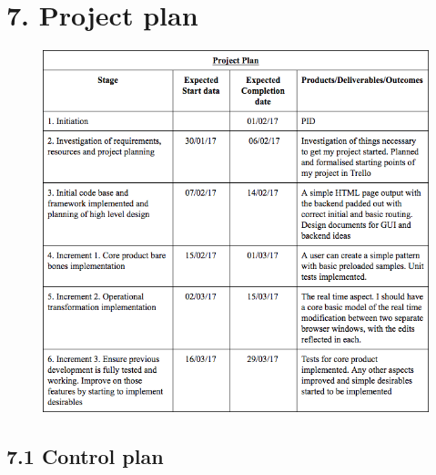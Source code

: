 \documentclass[a4paper]{article}
\begin{document}
\section{7. Project plan}

\begin{figure}

    \includegraphics[width=\linewidth]{../../img/project-plan-table.png}

\end{figure}

\subsection{7.1 Control plan}
\end{document}
